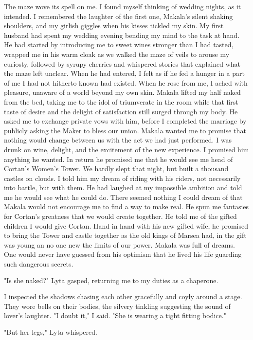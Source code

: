 \documentclass{article}
\begin{document}
The maze wove its spell on me. I found myself thinking of wedding nights, as it intended. I remembered the laughter of the first one, Makala's silent shaking shoulders, and my girlish giggles when his kisses tickled my skin. My first husband had spent my wedding evening bending my mind to the task at hand. He had started by introducing me to sweet wines stronger than I had tasted, wrapped me in his warm cloak as we walked the maze of veils to arouse my curiosty, followed by syrupy cherries and whispered stories that explained what the maze left unclear. When he had entered, I felt as if he fed a hunger in a part of me I had not hitherto known had existed. When he rose from me, I ached with pleasure, unaware of a world beyond my own skin. Makala lifted my half naked from the bed, taking me to the idol of triumverate in the room while that first taste of desire and the delight of satisfaction still surged through my body. He asked me to exchange private vows with him, before I completed the marriage by publicly asking the Maker to bless our union. Makala wanted me to promise that nothing would change between us with the act we had just performed. I was drunk on wine, delight, and the excitement of the new experience. I promised him anything he wanted. In return he promised me that he would see me head of Cortan's Women's Tower. We hardly slept that night, but built a thousand castles on clouds. I told him my dream of riding with his riders, not necessarily into battle, but with them. He had laughed at my impossible ambition and told me he would see what he could do. There seemed nothing I could dream of that Makala would not encourage me to find a way to make real. He spun me fantasies for Cortan's greatness that we would create together. He told me of the gifted children I would give Cortan. Hand in hand with his new gifted wife, he promised to bring the Tower and castle together as the old kings of Marsea had, in the gift was young an no one new the limits of our power. Makala was full of dreams. One would never have guessed from his optimism that he lived his life guarding such dangerous secrets.

"Is she naked?" Lyta gasped, returning me to my duties as a chaperone.

I inspected the shadows chasing each other gracefully and coyly around a stage. They wore bells on their bodies, the silvery tinkling suggesting the sound of lover's laughter. "I doubt it," I said. "She is wearing a tight fitting bodice."

"But her legs," Lyta whispered.
\end{document}
